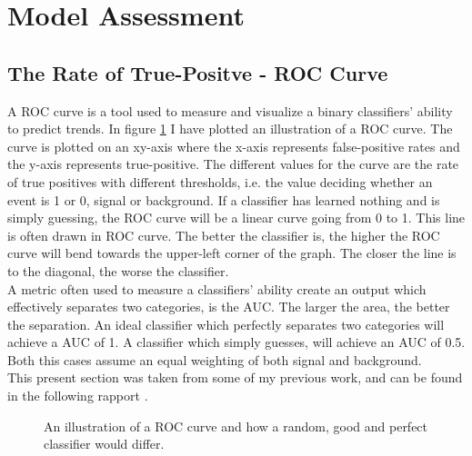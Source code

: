 \section{Model Assessment}\label{subsec:Cost}
\subsection{The Rate of True-Positve - ROC Curve}\label{subsec:AUC}
A \ac{ROC} curve is a tool used to measure and visualize a binary classifiers' ability 
to predict trends. In figure \ref{fig:ROC} I have plotted an illustration of a \ac{ROC} curve.
The curve is plotted on an xy-axis where the x-axis represents 
false-positive rates and the y-axis represents true-positive. The different values 
for the curve are the rate of true positives with different thresholds, i.e. 
the value deciding whether an event is 1 or 0, signal or background. If a classifier 
has learned nothing and is simply guessing, the \ac{ROC} curve will be a linear curve 
going from 0 to 1. This line is often drawn in \ac{ROC} curve. The better the 
classifier is, the higher the \ac{ROC} curve will bend towards the upper-left corner of the 
graph. The closer the line is to the diagonal, the worse the classifier. 
\\
A metric often used to measure a classifiers' ability create an output which effectively 
separates two categories, is the \ac{AUC}. The larger the area, the better the separation. 
An ideal classifier which perfectly separates two categories will achieve a \ac{AUC} of 1.
A classifier which simply guesses, will achieve an \ac{AUC} of 0.5. Both this cases assume 
an equal weighting of both signal and background. 
\\
This present section was taken from some of my previous work, and can be found in the following 
rapport \cite{HirstFretteML}.
\begin{figure}
    \centering
    \caption{An illustration of a \acs{ROC} curve and how a random, good and perfect classifier would differ.}
    \label{fig:ROC}
\end{figure}
